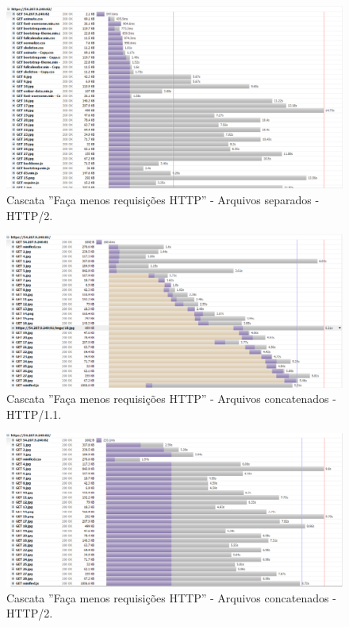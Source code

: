 \begin{apendicesenv}
\begin{landscape}
	\begin{figure}[!htb]
    	\centering
	    \caption{Cascata ''Faça menos requisições HTTP'' - Arquivos separados - HTTP/2.}
	    \includegraphics[width=1.5\textwidth]{./04-figuras/cascatas/separados_http2}
	\end{figure}
\end{landscape}

\begin{landscape}
	\begin{figure}[!htb]
    	\centering
	    \caption{Cascata ''Faça menos requisições HTTP'' - Arquivos concatenados - HTTP/1.1.}
    	\includegraphics[width=1.5\textwidth]{./04-figuras/cascatas/concatenado_http11}
	\end{figure}
\end{landscape}

\begin{landscape}
	\begin{figure}[!htb]
    	\centering
	    \caption{Cascata ''Faça menos requisições HTTP'' - Arquivos concatenados - HTTP/2.}
	    \includegraphics[width=1.5\textwidth]{./04-figuras/cascatas/concatenado_http2}
	\end{figure}
\end{landscape}


\end{apendicesenv}
